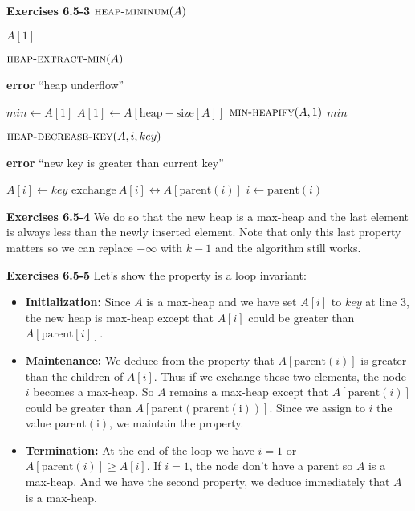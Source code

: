 \documentclass[a4paper,12pt]{article}
\newcommand{\newpar}[1]
{\bigskip \noindent \textbf{Exercises #1} \newline}
\newcommand{\la}{\leftarrow}
\newcommand{\exchange}[2]{\mathrm{exchange}\ #1 \leftrightarrow #2}
\newenvironment{alg}[2]
               {\noindent $\textsc{#1}(#2)$ \begin{algorithmic}}
               {\end{algorithmic}}
\begin{document}
\newpar{6.5-3}
\begin{alg}{heap-mininum}{A}
  \RETURN $A[1]$
\end{alg}

\medskip
\begin{alg}{heap-extract-min}{A}
  \STATE \textbf{error} ``heap underflow''
  \ENDIF

  \STATE $min \la A[1]$
  \STATE $A[1] \la A[\mathrm{heap-size}[A]]$
  \STATE $\textsc{min-heapify}(A, 1)$
  \RETURN $min$
\end{alg}

\medskip
\begin{alg}{heap-decrease-key}{A, i, key}
  \STATE \textbf{error} ``new key is greater than current key''
  \ENDIF

  \STATE $A[i] \la key$
  \STATE $\exchange{A[i]}{A[\mathrm{parent}(i)]}$
  \STATE $i \la \mathrm{parent}(i)$
  \ENDWHILE
\end{alg}

\newpar{6.5-4}
We do so that the new heap is a max-heap and the last element is always
less than the newly inserted element.  Note that only this last
property matters so we can replace $-\infty$ with $k-1$ and the
algorithm still works.

\newpar{6.5-5}
Let's show the property is a loop invariant:

\begin{itemize}
\item \textbf{Initialization: }  Since $A$ is a max-heap and we have
  set $A[i]$ to $key$ at line $3$,  the new heap is max-heap except
  that $A[i]$ could be greater than $A[\mathrm{parent}[i]]$.

  \item \textbf{Maintenance: } We deduce from the property that
    $A[\mathrm{parent}(i)]$ is greater than the children of $A[i]$.
    Thus if we exchange these two elements, the node $i$ becomes a
    max-heap.  So $A$ remains a max-heap except that
    $A[\mathrm{parent}(i)]$ could be greater than
    $A[\mathrm{parent(\mathrm{prarent(i)})}]$.  Since we assign to $i$
    the value $\mathrm{parent(i)}$, we maintain the property.

    \item \textbf{Termination: } At the end of the loop we have $i = 1$
      or $A[\mathrm{parent}(i)] \ge A[i]$.  If $i=1$, the node don't
      have a parent so $A$ is a max-heap.  And we have the second
      property, we deduce immediately that $A$ is a max-heap.
\end{itemize}
\end{document}

